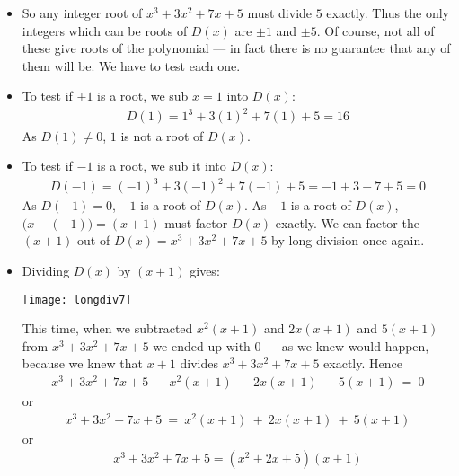 \begin{eg}
\begin{itemize}
\begin{itemize}
\item So any integer root of $x^3+3x^2+7x+5$ must divide $5$ exactly. Thus the only
integers which can be roots of $D(x)$ are $\pm 1$ and $\pm 5$. Of course, not all of
these give roots of the polynomial --- in fact there is no guarantee that any of them
will be. We have to test each one.

\item To test if $+1$ is a root, we sub $x=1$ into $D(x)$:
\begin{align*}
D(1)=1^3+3(1)^2+7(1)+5=16
\end{align*}
As $D(1)\ne 0$, $1$ is not a root of $D(x)$.
\item To test if $-1$ is a root, we sub it into $D(x)$:
\begin{align*}
D(-1)=(-1)^3+3(-1)^2+7(-1)+5=-1+3-7+5=0
\end{align*}
As $D(-1)= 0$, $-1$ is a root of $D(x)$. As $-1$ is a root of $D(x)$,
$\big(x-(-1)\big)=(x+1)$ must factor $D(x)$ exactly. We can factor the
$(x+1)$ out of $D(x)=x^3+3x^2+7x+5$ by long division once again.

\item Dividing $D(x)$ by $(x+1)$ gives:
\begin{center}
\texttt{[image: longdiv7]}
\end{center}
This time, when we subtracted $x^2(x+1)$ and $2x(x+1)$ and $5(x+1)$ from $x^3+3x^2+7x+5$
we ended up with $0$ --- as we knew would happen, because we knew that $x+1$ divides
$x^3+3x^2+7x+5$ exactly. Hence
\begin{align*}
x^3+3x^2+7x+5\ -\ x^2(x+1)\ -\ 2x(x+1)\ -\ 5(x+1)\ =\ 0
\end{align*}
or
\begin{align*}
x^3+3x^2+7x+5\ =\ x^2(x+1)\ +\ 2x(x+1)\ +\ 5(x+1)
\end{align*}
or
\begin{align*}
x^3+3x^2+7x+5=(x^2+2x+5)(x+1)
\end{align*}


\end{itemize}
\end{itemize}
\end{eg}
